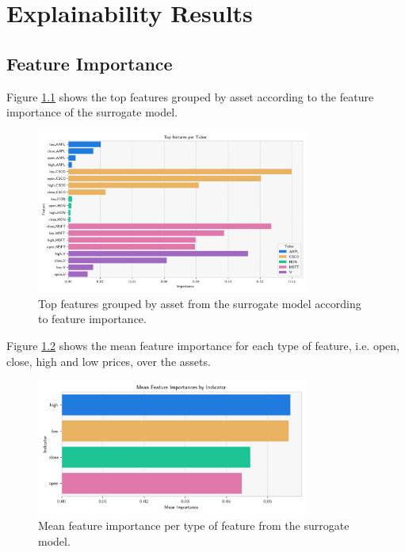\chapter{Explainability Results} \label{app:explainability}

\section{Feature Importance} \label{app:feature_importance}

Figure \ref{fig:feature_importance_by_asset} shows the top features grouped by asset according to the feature importance of the surrogate model. 

\begin{figure}
    \centering
    \includegraphics[width=0.8\textwidth]{figures/feature_importance_top_features_by_ticker.png}
    \caption{Top features grouped by asset from the surrogate model according to feature importance.}
    \label{fig:feature_importance_by_asset}
\end{figure}

Figure \ref{fig:mean_feature_importance_by_feature} shows the mean feature importance for each type of feature, i.e. open, close, high and low prices, over the assets.

\begin{figure}
    \centering
    \includegraphics[width=0.8\textwidth]{figures/feature_importance_mean_indicator.png}
    \caption{Mean feature importance per type of feature from the surrogate model.}
    \label{fig:mean_feature_importance_by_feature}
\end{figure}
